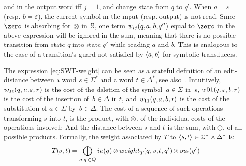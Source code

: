 and in the output word iff $j = 1$, %
and change state from $q$ to $q'$.
When $a = \varepsilon$ (resp. $b = \varepsilon$), the current symbol 
in the input (resp. output) is not read.
%
%
Since~$\zero$ is absorbing for~$\otimes$ in~$\mathbb{S}$,
one term $\wei_{ij}(q, a, b, q'')$ equal to $\zero$ in the above expression 
will be ignored in the sum, meaning that there is no possible transition
from state $q$ into state $q'$ while reading $a$ and $b$.
This is analogous to the case of a transition's guard not satisfied by $\<a, b>$ for 
symbolic transducers.

%

The expression \eqref{eq:SWT-weight} 
can be seen as a stateful definition of 
an edit-distance between a word $s \in \Sigma^*$ and a word $t \in \Delta^*$,
see also~\cite{Mohri03ijfcs}.
Intuitively, 
$\wei_{10}(q, a, \varepsilon, r)$ is the cost of 
the deletion of the symbol~$a \in \Sigma$ in~$s$, 
$\wei{01}(q, \varepsilon, b, r)$ is the cost 
of the insertion of~$b \in \Delta$ in $t$, 
and $\wei_{11}(q, a, b, r)$ is the cost 
of the substitution of  $a \in \Sigma$ by~$b \in \Delta$.
%
The cost of a sequence of such operations transforming $s$ into $t$, 
is the product, with $\otimes$, of the individual costs of the operations involved;
And the distance between $s$ and $t$ is the sum, with $\oplus$,
of all possible products.
%
\medskip\noindent
Formally, the weight associated by $T$ to $\< s, t> \in \Sigma^* \times \Delta^*$ is: 
\begin{equation}
T(s, t)  = 
\displaystyle\bigoplus_{q, q' \in Q} \init(q) 
\mathop{\otimes} \weight_T(q, s, t, q') \mathop{\otimes} \final(q')
\label{eq:SWT-value}
\end{equation}

